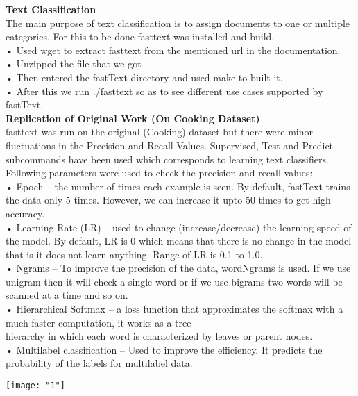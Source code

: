 \documentclass[12pt]{article}
\begin{document}
\noindent\textbf{Text Classification }\\
The main purpose of text classification is to assign documents to one or multiple categories. For this to be done fasttext was installed and build.\\
•	Used wget to extract fasttext from the mentioned url in the documentation.\\
•	Unzipped the file that we got\\
•	Then entered the fastText directory and used make to built it.\\
•	After this we run ./fasttext so as to see different use cases supported by fastText.\\

\noindent\textbf{Replication of Original Work (On Cooking Dataset)}\\
fasttext was run on the original (Cooking) dataset but there were minor fluctuations in the Precision and Recall Values. Supervised, Test and Predict subcommands have been used which corresponds to learning text classifiers. Following parameters were used to check the precision and recall values: -\\ 
•	Epoch – the number of times each example is seen. By default, fastText trains the data only 5 times. However, we can increase it upto 50 times to get high accuracy.\\
•	Learning Rate (LR) – used to change (increase/decrease) the learning speed of the model. By default, LR is 0 which means that there is no change in the model that is it does not learn anything. Range of LR is 0.1 to 1.0.\\
•	Ngrams – To improve the precision of the data, wordNgrams is used. If we use unigram then it will check a single word or if we use bigrams two words will be scanned at a time and so on.\\
•	Hierarchical Softmax – a loss function that approximates the softmax with a much faster computation, it works as a tree\\ hierarchy in which each word is characterized by leaves or parent nodes.\\
•	Multilabel classification – Used to improve the efficiency. It predicts the probability of the labels for multilabel data.\\


\begin{center}
	\begin{minipage}{\linewidth}
		\centering
		\texttt{[image: "1"]}
		
	\end{minipage}
\end{center}
\end{document}
